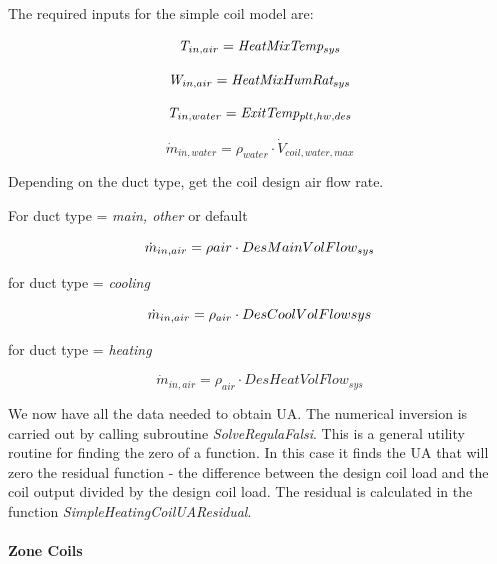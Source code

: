 The required inputs for the simple coil model are:

\begin{equation}
\emph{T\(_{in,air}\)} = \emph{HeatMixTemp\(_{sys}\)}
\end{equation}

\begin{equation}
\emph{W\(_{in,air}\)} = \emph{HeatMixHumRat\(_{sys}\)}
\end{equation}

\begin{equation}
\emph{T\(_{in,water}\)} = \emph{ExitTemp\(_{plt,hw,des}\)}
\end{equation}

\begin{equation}
\dot m_{in,water} = \rho_{water} \cdot \dot V_{coil,water,max}
\end{equation}

Depending on the duct type, get the coil design air flow rate.

For duct type = \emph{main, other} or default

\begin{equation}
\emph{\(\dot m_{in,air} = \rho{air} \cdot DesMainVolFlow_{sys}\)}
\end{equation}

for duct type = \emph{cooling}

\begin{equation}
\emph{\(\dot m_{in,air} = \rho_{air} \cdot DesCoolVolFlowsys\)}
\end{equation}

for duct type = \emph{heating}

\begin{equation}
\dot m_{in,air} = \rho_{air} \cdot DesHeatVolFlow_{sys}
\end{equation}

We now have all the data needed to obtain UA. The numerical inversion is carried out by calling subroutine \emph{SolveRegulaFalsi}. This is a general utility routine for finding the zero of a function. In this case it finds the UA that will zero the residual function - the difference between the design coil load and the coil output divided by the design coil load. The residual is calculated in the function \emph{SimpleHeatingCoilUAResidual}.

\paragraph{Zone Coils}\label{zone-coils-1}


